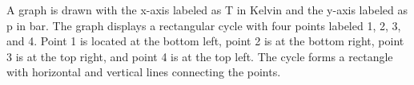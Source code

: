 A graph is drawn with the x-axis labeled as T in Kelvin and the y-axis labeled as p in bar. The graph displays a rectangular cycle with four points labeled 1, 2, 3, and 4. Point 1 is located at the bottom left, point 2 is at the bottom right, point 3 is at the top right, and point 4 is at the top left. The cycle forms a rectangle with horizontal and vertical lines connecting the points.